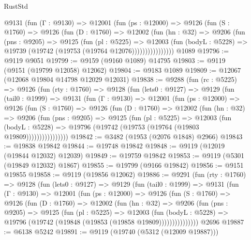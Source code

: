 \begin{lexlean}{RustStd}
\begin{coremodule}
            @9131
              (fun (Γ : @9130) =>
              @12001
                (fun (ps : @12000) =>
                @9126
                  (fun (S : @1760) =>
                  @9126
                    (fun (D : @1760) =>
                    @12002
                      (fun (hn : @32) =>
                      @9206
                        (fun (pns : @9205) =>
                        @9125
                          (fun (pl : @5225) =>
                          @12003
                            (fun (bodyL : @5228) =>
                            @19739 (@19742 (@19753 (@19764 @12076))))))))))))))))
    @1089
@19796 := @9119 @9051
@19799 := @9159 (@9160 @1089) @14795
@19803 := @9119 (@9151 (@19799 @12058) @12062)
@19804 := @9183 @1089
@19809 := @12067 (@12068 @19804 @14798 @12029 @12031)
@19838 := @9288
    (fun (rc : @5225) =>
    @9126
      (fun (rty : @1760) =>
      @9128
        (fun (lets0 : @9127) =>
        @9129
          (fun (tail0 : @1999) =>
          @9131
            (fun (Γ : @9130) =>
            @12001
              (fun (ps : @12000) =>
              @9126
                (fun (S : @1760) =>
                @9126
                  (fun (D : @1760) =>
                  @12002
                    (fun (hn : @32) =>
                    @9206
                      (fun (pns : @9205) =>
                      @9125
                        (fun (pl : @5225) =>
                        @12003
                          (fun (bodyL : @5228) =>
                          @19796 (@19742 (@19753 (@19764 (@19803 @19809))))))))))))))))
@19842 := @3482 (@1953 (@2076 @1848) @2966)
@19843 := @19838 @19842
@19844 := @19748 @19842
@19848 := @9119 (@12019 (@19844 @12032) @12039)
@19849 := @19759 @19842
@19853 := @9119 (@5301 (@19849 @12032) @1867)
@19855 := @19799 (@9166 @19842)
@19856 := @9151 @19855
@19858 := @9119 (@19856 @12062)
@19886 := @9291
    (fun (rty : @1760) =>
    @9128
      (fun (lets0 : @9127) =>
      @9129
        (fun (tail0 : @1999) =>
        @9131
          (fun (Γ : @9130) =>
          @12001
            (fun (ps : @12000) =>
            @9126
              (fun (S : @1760) =>
              @9126
                (fun (D : @1760) =>
                @12002
                  (fun (hn : @32) =>
                  @9206
                    (fun (pns : @9205) =>
                    @9125
                      (fun (pl : @5225) =>
                      @12003
                        (fun (bodyL : @5228) =>
                        @19796 (@19742 (@19848 (@19853 (@19858 @19809)))))))))))))))
    @2696
@19887 := @6138 @5242
@19891 := @9119 (@19740 (@5312 (@12009 @19887)))

\end{coremodule}
\end{lexlean}
